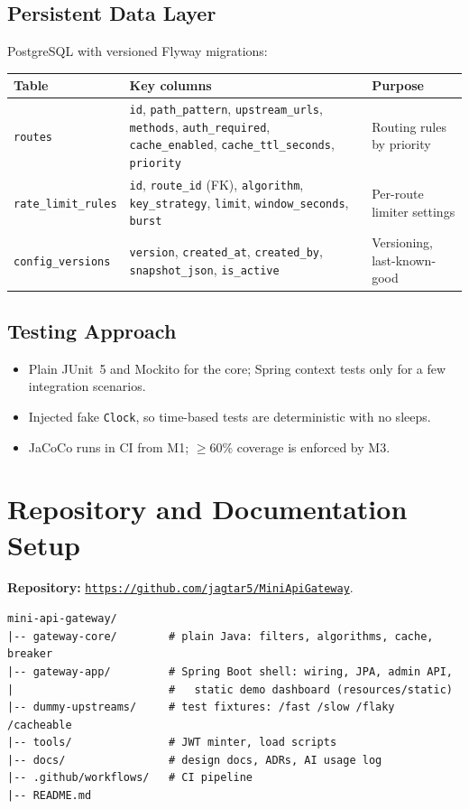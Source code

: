 \documentclass[12pt,a4paper]{article}
\newcommand{\code}[1]{\texttt{\url{#1}}}
\newcommand{\cls}[1]{\nolinkurl{#1}}
\begin{document}
\subsection{Persistent Data Layer}
\label{sec:schema}
PostgreSQL with versioned Flyway migrations:

\begingroup
\small
\setlength{\tabcolsep}{4pt}
\begin{tabular}{L{3.0cm} L{7.2cm} L{3.6cm}}
\toprule
\textbf{Table} & \textbf{Key columns} & \textbf{Purpose} \\
\midrule
\cls{routes} & \cls{id}, \cls{path_pattern}, \cls{upstream_urls}, \cls{methods}, \cls{auth_required}, \cls{cache_enabled}, \cls{cache_ttl_seconds}, \cls{priority} & Routing rules by priority \\
\cls{rate_limit_rules} & \cls{id}, \cls{route_id} (FK), \cls{algorithm}, \cls{key_strategy}, \cls{limit}, \cls{window_seconds}, \cls{burst} & Per-route limiter settings \\
\cls{config_versions} & \cls{version}, \cls{created_at}, \cls{created_by}, \cls{snapshot_json}, \cls{is_active} & Versioning, last-known-good \\
\bottomrule
\end{tabular}
\endgroup

\subsection{Testing Approach}
\begin{itemize}[noitemsep]
    \item Plain JUnit~5 and Mockito for the core; Spring context tests only for a few integration scenarios.
    \item Injected fake \cls{Clock}, so time-based tests are deterministic with no sleeps.
    \item JaCoCo runs in CI from M1; $\geq$60\% coverage is enforced by M3.
\end{itemize}

\section{Repository and Documentation Setup}
\label{sec:repo}
\textbf{Repository:} \code{https://github.com/jagtar5/MiniApiGateway}.

\begin{lstlisting}
mini-api-gateway/
|-- gateway-core/        # plain Java: filters, algorithms, cache, breaker
|-- gateway-app/         # Spring Boot shell: wiring, JPA, admin API,
|                        #   static demo dashboard (resources/static)
|-- dummy-upstreams/     # test fixtures: /fast /slow /flaky /cacheable
|-- tools/               # JWT minter, load scripts
|-- docs/                # design docs, ADRs, AI usage log
|-- .github/workflows/   # CI pipeline
|-- README.md
\end{lstlisting}
\end{document}
